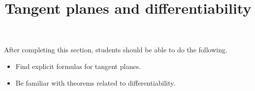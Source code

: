 \documentclass{ximera}
\title{Tangent planes and differentiability}
\begin{document}
\begin{abstract}
\end{abstract}

\maketitle

\begin{sectionOutcomes}

After completing this section, students should be able to do the following.

\begin{itemize}
\item Find explicit formulas for tangent planes.
\item Be familiar with theorems related to differentiability.
\end{itemize}

\end{sectionOutcomes}
\end{document}
